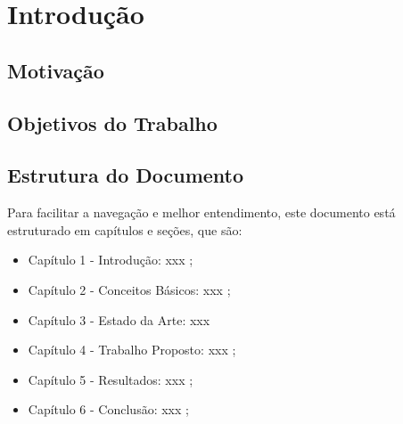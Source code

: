 \chapter{Introdução}

\lipsum


\section{Motivação}

\lipsum


\section{Objetivos do Trabalho}

\lipsum


\section{Estrutura do Documento}

Para facilitar a navegação e melhor entendimento, este documento está
estruturado em capítulos e seções, que são:
\begin{itemize}
\item {Capítulo 1 - Introdução}: xxx \cite{Yu:2004:ESG:1015090.1015207};
\item {Capítulo 2 - Conceitos Básicos}: xxx \cite{Cormen:2009};
\item {Capítulo 3 - Estado da Arte}: xxx \cite{Weicker:1984:DSS:358274.358283}
\item {Capítulo 4 - Trabalho Propost}o: xxx \cite{IEEE_802_11:6178212};
\item {Capítulo 5 - Resultados}: xxx \cite{Linux:402081};
\item {Capítulo 6 - Conclusão}: xxx \cite{SBC:2012};
\end{itemize}